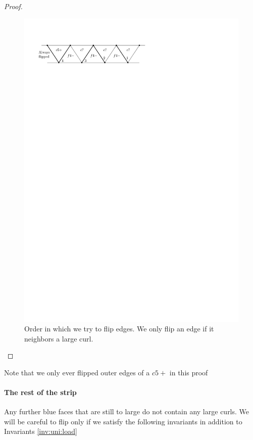 \begin{proof}
  \begin{figure}[h]
    \centering
    \includegraphics[scale=1]{unifiedAlgo/img/placeEdges}
    \caption{Order in which we try to flip edges. We only flip an edge if it neighbors a large curl.}
    \label{fig:uni:placeedges}
  \end{figure}

\end{proof}

  Note that we only ever flipped outer edges of a $c5+$ in this proof


\paragraph{The rest of the strip}

Any further blue faces that are still to large do not contain any large curls. We will be careful to flip only if we satisfy the following invariants in addition to Invariants \ref{inv:uni:load}

